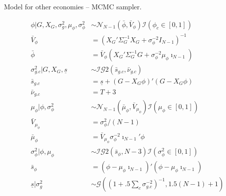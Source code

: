 \documentclass[notes,blackandwhite,mathsans,usenames,dvipsnames]{beamer}
\begin{document}
\begin{frame}{Model for other economies -- MCMC sampler.}

\footnotesize
\begin{align*}
\phi|G,X_G,\sigma_g^2,\mu_\phi,\sigma_\phi^2 &\sim\mathcal{N}_{N-1}\left(\bar{\phi},\bar{V}_\phi\right)\mathcal{I}\left(\phi_c\in[0,1]\right)\\
\bar{V}_\phi &= \left(X_G'\Sigma_G^{-1}X_G + \sigma_\phi^{-2}I_{N-1}\right)^{-1}\\
\bar{\phi}&= \bar{V}_\phi\left( X_G'\Sigma_G^{-1}G + \sigma_\phi^{-2}\mu_\phi \imath_{N-1} \right)\\[2ex]
\sigma_{g.c}^2|G,X_G,\underline{s} &\sim\mathcal{IG}2(\bar{s}_{g.c},\bar{\nu}_{g.c})\\
\bar{s}_{g.c} &=\underline{s} + (G-X_G \phi)'(G-X_G \phi) \\
\bar{\nu}_{g.c} &=T+3 \\[2ex]
\mu_\phi|\phi,\sigma_\phi^2&\sim\mathcal{N}_{N-1}\left(\bar{\mu}_\phi,\bar{V}_{\mu_\phi}\right)\mathcal{I}\left(\mu_\phi\in[0,1]\right)\\
\bar{V}_{\mu_\phi}&=\sigma_\phi^2/(N-1)\\
\bar{\mu}_\phi&=\bar{V}_{\mu_\phi}\sigma_\phi^{-2}\imath_{N-1}'\phi\\[2ex]
\sigma_\phi^2|\phi,\mu_\phi&\sim\mathcal{IG}2\left(\bar{s}_\phi, N-3\right)\mathcal{I}\left(\sigma_\phi^2\in[0,1]\right)\\
\bar{s}_\phi&= (\phi-\mu_\phi\imath_{N-1})'(\phi-\mu_\phi\imath_{N-1})\\
\underline{s}|\sigma_g^2&\sim\mathcal{G}\left(\left( 1 + .5\sum_c\sigma_{g.c}^{-2} \right)^{-1} , 1.5(N-1)+1 \right)
\end{align*}

\end{frame}
\end{document}
